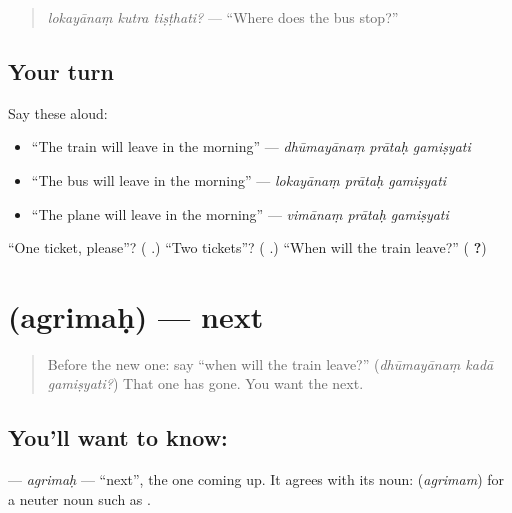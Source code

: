 \begin{quote}
\emph{lokayānaṃ kutra tiṣṭhati?} — \textquotedblleft{}Where does the bus stop?\textquotedblright{}
\end{quote}

\subsection*{Your turn}
Say these aloud:

\begin{itemize}
\raggedright
  \item \textquotedblleft{}The train will leave in the morning\textquotedblright{} — \emph{dhūmayānaṃ prātaḥ gamiṣyati}
  \item \textquotedblleft{}The bus will leave in the morning\textquotedblright{} — \emph{lokayānaṃ prātaḥ gamiṣyati}
  \item \textquotedblleft{}The plane will leave in the morning\textquotedblright{} — \emph{vimānaṃ prātaḥ gamiṣyati}
\end{itemize}

\begin{tcolorbox}[breakable,colback=teal!4,colframe=teal!35!black,title={Before you move on}]
\textquotedblleft{}One ticket, please\textquotedblright{}? (\textbf{  }.) \textquotedblleft{}Two tickets\textquotedblright{}? (\textbf{ }.) \textquotedblleft{}When will the train leave?\textquotedblright{} (\textbf{  ?})
\end{tcolorbox}
\section[\texorpdfstring{\sk{अग्रिमः} (agrimaḥ)}{अग्रिमः (agrimaḥ)}]{ (agrimaḥ) — next}

\label{lesson:SA-C281-agrimah}



\begin{quote}
Before the new one: say \textquotedblleft{}when will the train leave?\textquotedblright{} (\emph{dhūmayānaṃ kadā gamiṣyati?}) That one has gone. You want the next.
\end{quote}

\subsection*{You'll want to know: }
\textbf{} — \emph{agrimaḥ} — \textquotedblleft{}next\textquotedblright{}, the one coming up. It agrees with its noun: \textbf{} (\emph{agrimam}) for a neuter noun such as \textbf{}.

